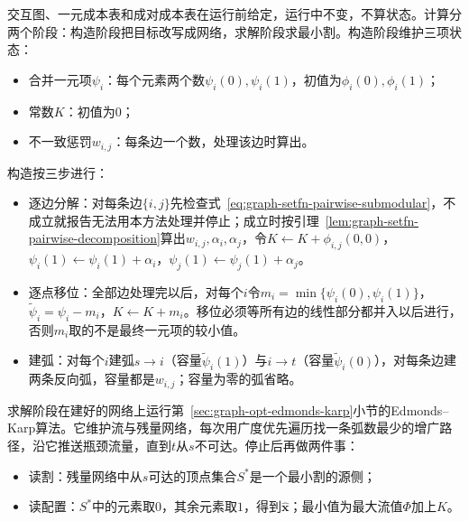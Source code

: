 交互图、一元成本表和成对成本表在运行前给定，运行中不变，不算状态。计算分两个阶段：构造阶段把目标改写成网络，求解阶段求最小割。构造阶段维护三项状态：
\begin{itemize}
  \item 合并一元项$\psi_i$：每个元素两个数$\psi_i(0),\psi_i(1)$，初值为$\phi_i(0),\phi_i(1)$；
  \item 常数$K$：初值为$0$；
  \item 不一致惩罚$w_{i,j}$：每条边一个数，处理该边时算出。
\end{itemize}
构造按三步进行：
\begin{itemize}
  \item 逐边分解：对每条边$\{i,j\}$先检查式~\eqref{eq:graph-setfn-pairwise-submodular}，不成立就报告无法用本方法处理并停止；成立时按引理~\ref{lem:graph-setfn-pairwise-decomposition}算出$w_{i,j},\alpha_i,\alpha_j$，令$K\gets K+\phi_{i,j}(0,0)$，$\psi_i(1)\gets\psi_i(1)+\alpha_i$，$\psi_j(1)\gets\psi_j(1)+\alpha_j$。
  \item 逐点移位：全部边处理完以后，对每个$i$令$m_i=\min\{\psi_i(0),\psi_i(1)\}$，$\tilde\psi_i=\psi_i-m_i$，$K\gets K+m_i$。移位必须等所有边的线性部分都并入以后进行，否则$m_i$取的不是最终一元项的较小值。
  \item 建弧：对每个$i$建弧$s\to i$（容量$\tilde\psi_i(1)$）与$i\to t$（容量$\tilde\psi_i(0)$），对每条边建两条反向弧，容量都是$w_{i,j}$；容量为零的弧省略。
\end{itemize}
求解阶段在建好的网络上运行第~\ref{sec:graph-opt-edmonds-karp}小节的Edmonds--Karp算法。它维护流与残量网络，每次用广度优先遍历找一条弧数最少的增广路径，沿它推送瓶颈流量，直到$t$从$s$不可达。停止后再做两件事：
\begin{itemize}
  \item 读割：残量网络中从$s$可达的顶点集合$S^\ast$是一个最小割的源侧；
  \item 读配置：$S^\ast$中的元素取$0$，其余元素取$1$，得到$\hat{\bm x}$；最小值为最大流值$\Phi$加上$K$。
\end{itemize}

